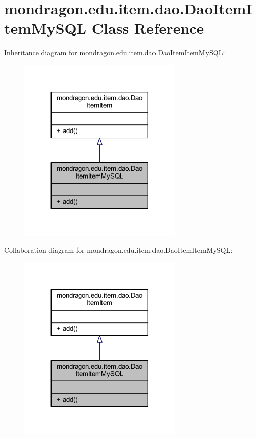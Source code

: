 \hypertarget{classmondragon_1_1edu_1_1item_1_1dao_1_1_dao_item_item_my_s_q_l}{}\section{mondragon.\+edu.\+item.\+dao.\+Dao\+Item\+Item\+My\+S\+QL Class Reference}
\label{classmondragon_1_1edu_1_1item_1_1dao_1_1_dao_item_item_my_s_q_l}


Inheritance diagram for mondragon.\+edu.\+item.\+dao.\+Dao\+Item\+Item\+My\+S\+QL\+:\nopagebreak
\begin{figure}[H]
\begin{center}
\leavevmode
\includegraphics[width=224pt]{classmondragon_1_1edu_1_1item_1_1dao_1_1_dao_item_item_my_s_q_l__inherit__graph}
\end{center}
\end{figure}


Collaboration diagram for mondragon.\+edu.\+item.\+dao.\+Dao\+Item\+Item\+My\+S\+QL\+:\nopagebreak
\begin{figure}[H]
\begin{center}
\leavevmode
\includegraphics[width=224pt]{classmondragon_1_1edu_1_1item_1_1dao_1_1_dao_item_item_my_s_q_l__coll__graph}
\end{center}
\end{figure}

